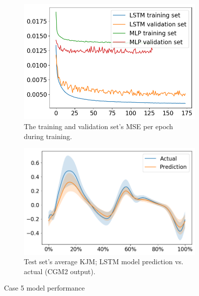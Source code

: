 \documentclass[../main.tex]{subfiles}
\begin{document}
\begin{figure}
     \centering
     \begin{subfigure}[b]{0.475\textwidth}
         \centering
         \includegraphics[width=\textwidth]{img/results/training_history/Case5_LSTMvsMLP_training.png}
         \caption{The training and validation set's \ac{MSE} per epoch during training.}
         \label{fig:case5-training-performance}
     \end{subfigure}
     \hfill
     \begin{subfigure}[b]{0.515\textwidth}
         \centering
         \includegraphics[width=\textwidth]{img/results/test_prediction_evaluation/Case5_LSTM_test_prediction.png}
         \caption{Test set's average \ac{KJM}; LSTM model prediction vs. actual (CGM2 output).}
         \label{fig:case5-prediction-performance}
     \end{subfigure}
    \caption{Case 5 model performance}
    \label{fig:case5-performance-plots}
\end{figure}

\end{document}
